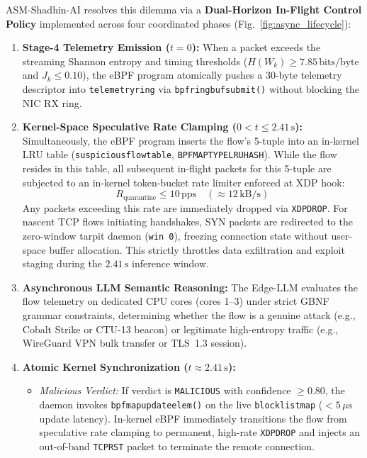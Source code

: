 \documentclass[journal]{IEEEtran}
\renewcommand{\_}{\textunderscore\allowbreak}
\begin{document}
ASM-Shadhin-AI resolves this dilemma via a \textbf{Dual-Horizon In-Flight Control Policy} implemented across four coordinated phases (Fig.~\ref{fig:async_lifecycle}):
\begin{enumerate}
  \item \textbf{Stage-4 Telemetry Emission ($t = 0$):} When a packet exceeds the streaming Shannon entropy and timing thresholds ($H(W_k) \ge 7.85\,\text{bits/byte}$ and $J_k \le 0.10$), the eBPF program atomically pushes a 30-byte telemetry descriptor into \texttt{telemetry\_ring} via \texttt{bpf\_ringbuf\_submit()} without blocking the NIC RX ring.
  \item \textbf{Kernel-Space Speculative Rate Clamping ($0 < t \le 2.41\,\text{s}$):} Simultaneously, the eBPF program inserts the flow's 5-tuple into an in-kernel LRU table (\texttt{suspicious\_flow\_table}, \texttt{BPF\_MAP\_TYPE\_LRU\_HASH}). While the flow resides in this table, all subsequent in-flight packets for this 5-tuple are subjected to an in-kernel token-bucket rate limiter enforced at XDP hook:
  \begin{equation}
    R_{\text{quarantine}} \le 10\,\text{pps} \quad (\approx 12\,\text{kB/s})
    \label{eq:rate_limit}
  \end{equation}
  Any packets exceeding this rate are immediately dropped via \texttt{XDP\_DROP}. For nascent TCP flows initiating handshakes, SYN packets are redirected to the zero-window tarpit daemon (\texttt{win~0}), freezing connection state without user-space buffer allocation. This strictly throttles data exfiltration and exploit staging during the $2.41\,\text{s}$ inference window.
  \item \textbf{Asynchronous LLM Semantic Reasoning:} The Edge-LLM evaluates the flow telemetry on dedicated CPU cores (cores 1--3) under strict GBNF grammar constraints, determining whether the flow is a genuine attack (e.g., Cobalt Strike or CTU-13 beacon) or legitimate high-entropy traffic (e.g., WireGuard VPN bulk transfer or TLS~1.3 session).
  \item \textbf{Atomic Kernel Synchronization ($t \approx 2.41\,\text{s}$):}
  \begin{itemize}
    \item \textit{Malicious Verdict:} If verdict is \texttt{MALICIOUS} with confidence $\ge 0.80$, the daemon invokes \texttt{bpf\_map\_update\_elem()} on the live \texttt{blocklist\_map} ($< 5\,\mu\text{s}$ update latency). In-kernel eBPF immediately transitions the flow from speculative rate clamping to permanent, high-rate \texttt{XDP\_DROP} and injects an out-of-band \texttt{TCP\_RST} packet to terminate the remote connection.

\end{itemize}
\end{enumerate}
\end{document}
